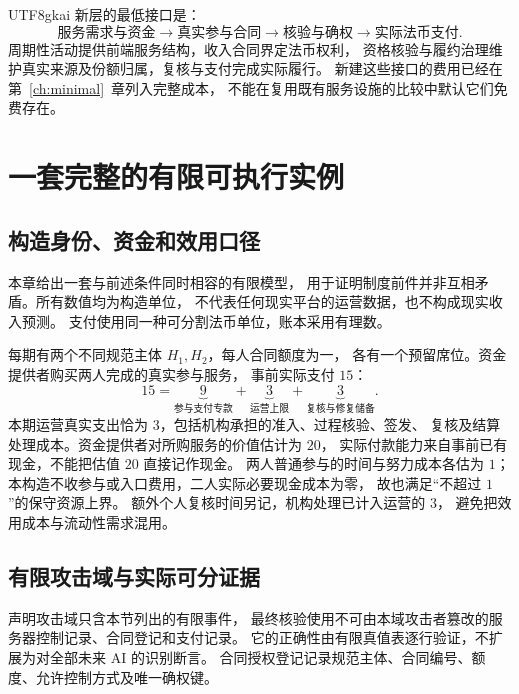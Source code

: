\documentclass[12pt,a4paper,openany]{report}
\begin{document}
\begin{CJK*}{UTF8}{gkai}
新层的最低接口是：
\[
\text{服务需求与资金}
\longrightarrow \text{真实参与合同}
\longrightarrow \text{核验与确权}
\longrightarrow \text{实际法币支付}.
\]
周期性活动提供前端服务结构，收入合同界定法币权利，
资格核验与履约治理维护真实来源及份额归属，复核与支付完成实际履行。
新建这些接口的费用已经在第~\ref{ch:minimal}~章列入完整成本，
不能在复用既有服务设施的比较中默认它们免费存在。

\chapter{一套完整的有限可执行实例}
\label{ch:example}

\section{构造身份、资金和效用口径}
本章给出一套与前述条件同时相容的有限模型，
用于证明制度前件并非互相矛盾。所有数值均为构造单位，
不代表任何现实平台的运营数据，也不构成现实收入预测。
支付使用同一种可分割法币单位，账本采用有理数。

每期有两个不同规范主体 \(H_1,H_2\)，每人合同额度为一，
各有一个预留席位。资金提供者购买两人完成的真实参与服务，
事前实际支付 \(15\)：
\[
15=\underbrace{9}_{\text{参与支付专款}}
+\underbrace{3}_{\text{运营上限}}
+\underbrace{3}_{\text{复核与修复储备}}.
\]
本期运营真实支出恰为 \(3\)，包括机构承担的准入、过程核验、签发、
复核及结算处理成本。资金提供者对所购服务的价值估计为 \(20\)，
实际付款能力来自事前已有现金，不能把估值 \(20\) 直接记作现金。
两人普通参与的时间与努力成本各估为 \(1\)；
本构造不收参与或入口费用，二人实际必要现金成本为零，
故也满足“不超过 \(1\)”的保守资源上界。
额外个人复核时间另记，机构处理已计入运营的 \(3\)，
避免把效用成本与流动性需求混用。

\section{有限攻击域与实际可分证据}
声明攻击域只含本节列出的有限事件，
最终核验使用不可由本域攻击者篡改的服务器控制记录、合同登记和支付记录。
它的正确性由有限真值表逐行验证，不扩展为对全部未来 AI 的识别断言。
合同授权登记记录规范主体、合同编号、额度、允许控制方式及唯一确权键。


\end{CJK*}
\end{document}
